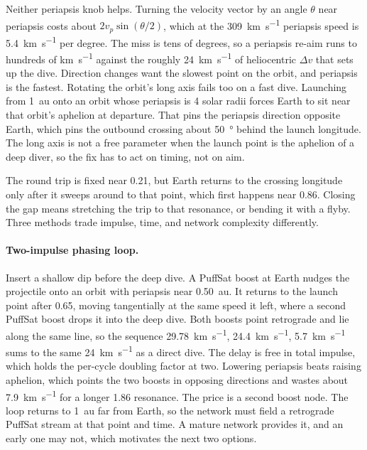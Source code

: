 \documentclass{article}
\newcommand{\deltav}{\Delta v}
\begin{document}
Neither periapsis knob helps. Turning the velocity vector by an angle $\theta$ near periapsis costs about $2v_p\sin(\theta/2)$, which at the \SI{309}{\kilo\meter\per\second} periapsis speed is \SI{5.4}{\kilo\meter\per\second} per degree. The miss is tens of degrees, so a periapsis re-aim runs to hundreds of \si{\kilo\meter\per\second} against the roughly \SI{24}{\kilo\meter\per\second} of heliocentric $\deltav$ that sets up the dive. Direction changes want the slowest point on the orbit, and periapsis is the fastest. Rotating the orbit's long axis fails too on a fast dive. Launching from \SI{1}{\astronomicalunit} onto an orbit whose periapsis is 4 solar radii forces Earth to sit near that orbit's aphelion at departure. That pins the periapsis direction opposite Earth, which pins the outbound crossing about \SI{50}{\degree} behind the launch longitude. The long axis is not a free parameter when the launch point is the aphelion of a deep diver, so the fix has to act on timing, not on aim.

The round trip is fixed near \SI{0.21}{\year}, but Earth returns to the crossing longitude only after it sweeps around to that point, which first happens near \SI{0.86}{\year}. Closing the gap means stretching the trip to that resonance, or bending it with a flyby. Three methods trade impulse, time, and network complexity differently.

\paragraph{Two-impulse phasing loop.} Insert a shallow dip before the deep dive. A PuffSat boost at Earth nudges the projectile onto an orbit with periapsis near \SI{0.50}{\astronomicalunit}. It returns to the launch point after \SI{0.65}{\year}, moving tangentially at the same speed it left, where a second PuffSat boost drops it into the deep dive. Both boosts point retrograde and lie along the same line, so the sequence \SI{29.78}{\kilo\meter\per\second}, \SI{24.4}{\kilo\meter\per\second}, \SI{5.7}{\kilo\meter\per\second} sums to the same \SI{24}{\kilo\meter\per\second} as a direct dive. The delay is free in total impulse, which holds the per-cycle doubling factor at two. Lowering periapsis beats raising aphelion, which points the two boosts in opposing directions and wastes about \SI{7.9}{\kilo\meter\per\second} for a longer \SI{1.86}{\year} resonance. The price is a second boost node. The loop returns to \SI{1}{\astronomicalunit} far from Earth, so the network must field a retrograde PuffSat stream at that point and time. A mature network provides it, and an early one may not, which motivates the next two options.
\end{document}
